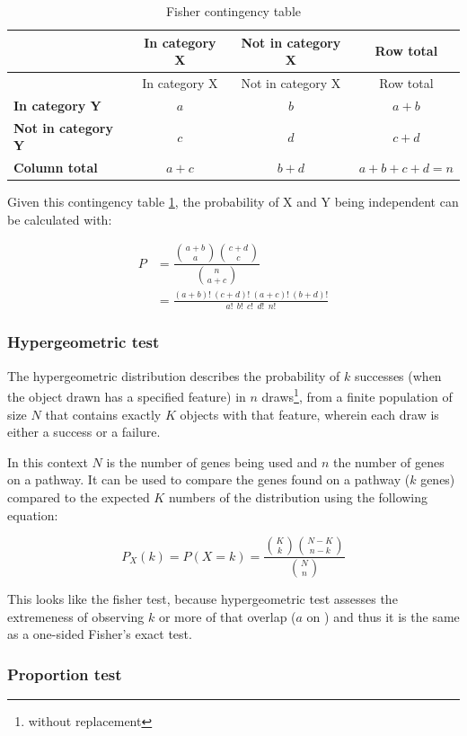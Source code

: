 \documentclass[
  12pt,
  a4paper,
  twoside,
  openright]{book}
\begin{document}
\begin{longtable}[]{@{}lccc@{}}
\caption{\label{tab:fisher} Fisher contingency table}\tabularnewline
\toprule
& In category X & Not in category X & Row total \\
\midrule
\endfirsthead
\toprule
& In category X & Not in category X & Row total \\
\midrule
\endhead
\textbf{In category Y} & \(a\) & \(b\) & \(a+b\) \\
\textbf{Not in category Y} & \(c\) & \(d\) & \(c+d\) \\
\textbf{Column total} & \(a+c\) & \(b+d\) & \(a+b+c+d = n\) \\
\bottomrule
\end{longtable}

Given this contingency table \ref{tab:fisher}, the probability of X and Y being independent can be calculated with:

\[
\begin{aligned}
P & = \dfrac{ \binom{a+b}{a} \binom{c+d}{c} }{\binom{n}{a+c}} \\
& = \frac{(a+b)!~(c+d)!~(a+c)!~(b+d)!}{a!~~b!~~c!~~d!~~n!}
\end{aligned}
\]

\hypertarget{hypergeometric-test}{%
\subsubsection{Hypergeometric test}\label{hypergeometric-test}}

The hypergeometric distribution describes the probability of \(k\) successes (when the object drawn has a specified feature) in \(n\) draws\footnote{without replacement}, from a finite population of size \(N\) that contains exactly \(K\) objects with that feature, wherein each draw is either a success or a failure.

In this context \(N\) is the number of genes being used and \(n\) the number of genes on a pathway.
It can be used to compare the genes found on a pathway (\(k\) genes) compared to the expected \(K\) numbers of the distribution using the following equation:

\[
P_X(k) = P(X = k) 
= \frac{\binom{K}{k} \binom{N - K}{n-k}}{\binom{N}{n}}
\]

This looks like the fisher test, because hypergeometric test assesses the extremeness of observing \(k\) or more of that overlap (\(a\) on ) and thus it is the same as a one-sided Fisher's exact test.

\hypertarget{proportion-test}{%
\subsubsection{Proportion test}\label{proportion-test}}
\end{document}
